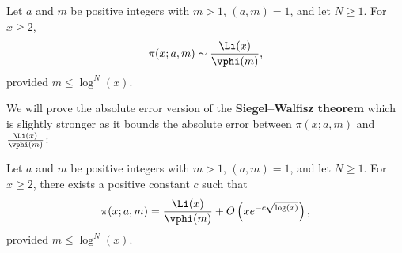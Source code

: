     \begin{theorem}
      Let $a$ and $m$ be positive integers with $m > 1$, $(a,m) = 1$, and let $N \ge 1$. For $x \ge 2$,
      \[
        \pi(x;a,m) \sim \frac{\Li(x)}{\vphi(m)},
      \]
      provided $m \le \log^{N}(x)$.
    \end{theorem}
    
    We will prove the absolute error version of the \textbf{Siegel–Walfisz theorem} which is slightly stronger as it bounds the absolute error between $\pi(x;a,m)$ and $\frac{\Li(x)}{\vphi(m)}$:

    \begin{theorem}
      Let $a$ and $m$ be positive integers with $m > 1$, $(a,m) = 1$, and let $N \ge 1$. For $x \ge 2$, there exists a positive constant $c$ such that
      \[
        \pi(x;a,m) = \frac{\Li(x)}{\vphi(m)}+O\left(xe^{-c\sqrt{\log(x)}}\right),
      \]
      provided $m \le \log^{N}(x)$.
    \end{theorem}
